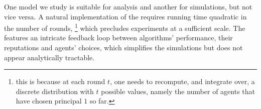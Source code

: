 One model we study is suitable for analysis and another for simulations, but not vice versa. A natural implementation of the \TheoryModel requires running time quadratic in the number of rounds,%
\footnote{\label{fn:Tsquared}\Eg this is because at each round $t$, one needs to recompute, and integrate over, a discrete distribution with $t$ possible values, namely the number of agents that have chosen principal $1$ so far.}
which precludes experiments at a sufficient scale. The \ExptsModel features an intricate feedback loop between algorithms' performance, their reputations and agents' choices, which simplifies the simulations but does not appear analytically tractable.











